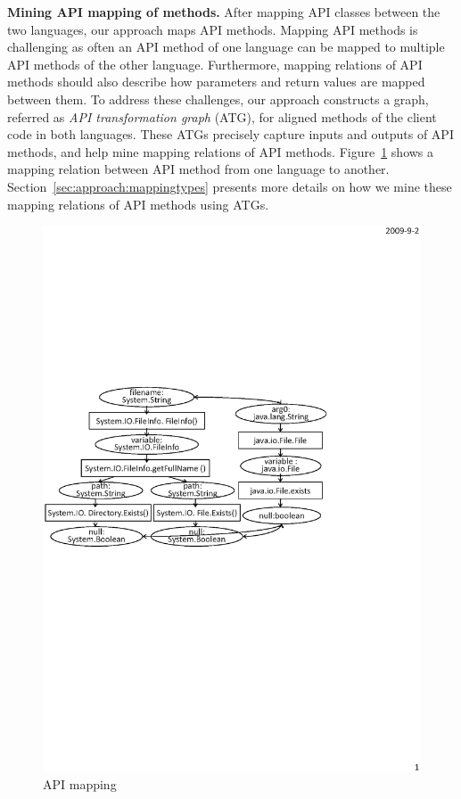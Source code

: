 \textbf{Mining API mapping of methods.} After mapping API classes
between the two languages, our approach maps API methods. Mapping
API methods is challenging as often an API method of one language
can be mapped to multiple API methods of the other language.
Furthermore, mapping relations of API methods should also describe
how parameters and return values are mapped between them. To address
these challenges, our approach constructs a graph, referred as
\emph{API transformation graph} (ATG), for aligned methods of the
client code in both languages. These ATGs precisely capture inputs
and outputs of API methods, and help mine mapping relations of API
methods. Figure~\ref{fig:example} shows a mapping relation between
API method  from one language to another.
Section~\ref{sec:approach:mappingtypes} presents more details on how
we mine these mapping relations of API methods using ATGs.

\begin{figure}[t]
\centering %
\includegraphics[scale=0.95,clip]{figure/sample.eps}\vspace*{-3ex}
 \caption{\label{fig:example}API mapping}\vspace*{-3ex}
\end{figure}

